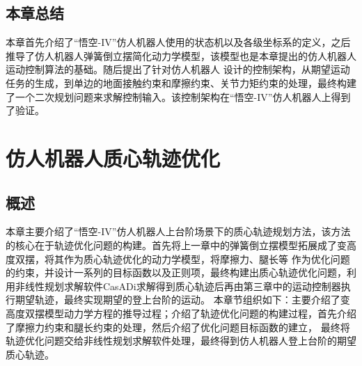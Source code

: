 \section{本章总结}
本章首先介绍了“悟空-IV”仿人机器人使用的状态机以及各级坐标系的定义，之后推导了仿人机器人弹簧倒立摆简化动力学模型，该模型也是本章提出的仿人机器人运动控制算法的基础。随后提出了针对仿人机器人
设计的控制架构，从期望运动任务的生成，到单边的地面接触约束和摩擦约束、关节力矩约束的处理，最终构建了一个二次规划问题来求解控制输入。该控制架构在“悟空-IV”仿人机器人上得到了验证。
\chapter{仿人机器人质心轨迹优化}
\section{概述}
本章主要介绍了“悟空-IV”仿人机器人上台阶场景下的质心轨迹规划方法，该方法的核心在于轨迹优化问题的构建。首先将上一章中的弹簧倒立摆模型拓展成了变高度双摆，将其作为质心轨迹优化的动力学模型，将摩擦力、腿长等
作为优化问题的约束，并设计一系列的目标函数以及正则项，最终构建出质心轨迹优化问题，利用非线性规划求解软件CasADi求解得到质心轨迹后再由第三章中的运动控制器执行期望轨迹，最终实现期望的登上台阶的运动。
本章节组织如下：主要介绍了变高度双摆模型动力学方程的推导过程；介绍了轨迹优化问题的构建过程，首先介绍了摩擦力约束和腿长约束的处理，然后介绍了优化问题目标函数的建立，
最终将轨迹优化问题交给非线性规划求解软件处理，最终得到仿人机器人登上台阶的期望质心轨迹。


